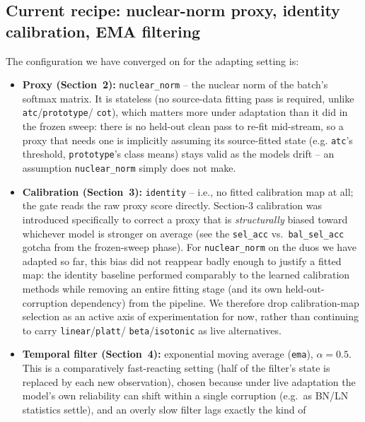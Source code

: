 \subsection{Current recipe: nuclear-norm proxy, identity calibration, EMA filtering}
\label{sec:experiments:recipe}

The configuration we have converged on for the adapting setting is:

\begin{itemize}
    \item \textbf{Proxy (Section~2):} \texttt{nuclear\_norm} -- the nuclear
    norm of the batch's softmax matrix. It is stateless (no source-data
    fitting pass is required, unlike \texttt{atc}/\texttt{prototype}/%
    \texttt{cot}), which matters more under adaptation than it did in the
    frozen sweep: there is no held-out clean pass to re-fit mid-stream, so a
    proxy that needs one is implicitly assuming its source-fitted state
    (e.g. \texttt{atc}'s threshold, \texttt{prototype}'s class means) stays
    valid as the models drift -- an assumption \texttt{nuclear\_norm} simply
    does not make.
    \item \textbf{Calibration (Section~3):} \texttt{identity} -- i.e., no
    fitted calibration map at all; the gate reads the raw proxy score
    directly. Section-3 calibration was introduced specifically to correct a
    proxy that is \emph{structurally} biased toward whichever model is
    stronger on average (see the \texttt{sel\_acc} vs.\ \texttt{bal\_sel\_acc}
    gotcha from the frozen-sweep phase). For \texttt{nuclear\_norm} on the
    duos we have adapted so far, this bias did not reappear badly enough to
    justify a fitted map: the identity baseline performed comparably to the
    learned calibration methods while removing an entire fitting stage (and
    its own held-out-corruption dependency) from the pipeline. We therefore
    drop calibration-map selection as an active axis of experimentation for
    now, rather than continuing to carry \texttt{linear}/\texttt{platt}/%
    \texttt{beta}/\texttt{isotonic} as live alternatives.
    \item \textbf{Temporal filter (Section~4):} exponential moving average
    (\texttt{ema}), $\alpha = 0.5$. This is a comparatively fast-reacting
    setting (half of the filter's state is replaced by each new
    observation), chosen because under live adaptation the model's own
    reliability can shift within a single corruption (e.g.\ as BN/LN
    statistics settle), and an overly slow filter lags exactly the kind of

\end{itemize}
